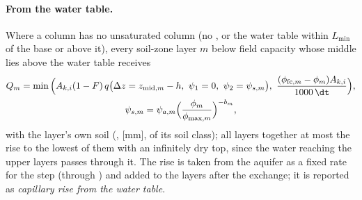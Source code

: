 \paragraph{From the water table.} Where a column has no unsaturated column (no , or the water
table within $L_{\min}$ of the base or above it), every soil-zone layer $m$ below field capacity whose middle lies above
the water table receives
\begin{gather}
Q_m=\min\Big(A_{k,i}(1-F)\,q\big(\Delta z=z_{\mathrm{mid},m}-h,\ \psi_1=0,\ \psi_2=\psi_{s,m}\big),\ \frac{(\phi_{\mathrm{fc},m}-\phi_m)A_{k,i}}{1000\,\dt}\Big),\\
\psi_{s,m}=\psi_{a,m}\Big(\frac{\phi_m}{\phi_{\max,m}}\Big)^{-b_m},\nonumber
\end{gather}
with the layer's own soil (,  [mm],  of its soil class); all
layers together at most the rise to the lowest of them with an infinitely dry top, since the water reaching the upper
layers passes through it. The rise is taken from the aquifer as a fixed rate for the step (through ) and
added to the layers after the exchange; it is reported as \emph{capillary rise from the water table}.

